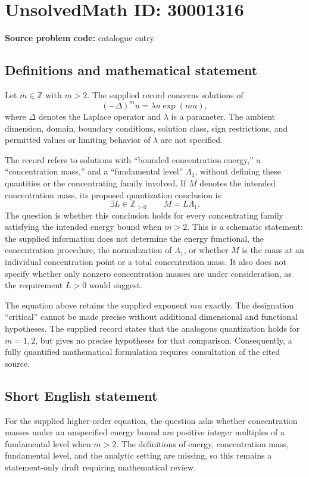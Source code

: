 \documentclass[11pt]{article}
\newcommand{\Z}{\mathbb{Z}}
\begin{document}
\section*{UnsolvedMath ID: 30001316}
\textbf{Source problem code:} catalogue entry
\subsection{Definitions and mathematical statement}
Let \(m\in\Z\) with \(m>2\). The supplied record concerns solutions of
\[
(-\Delta)^m u=\lambda u\exp(mu),
\]
where \(\Delta\) denotes the Laplace operator and \(\lambda\) is a parameter. The ambient dimension, domain, boundary conditions, solution class, sign restrictions, and permitted values or limiting behavior of \(\lambda\) are not specified.

The record refers to solutions with ``bounded concentration energy,'' a ``concentration mass,'' and a ``fundamental level'' \(\Lambda_1\), without defining these quantities or the concentrating family involved. If \(M\) denotes the intended concentration mass, its proposed quantization conclusion is
\[
\exists L\in\Z_{>0}\qquad M=L\Lambda_1.
\]
The question is whether this conclusion holds for every concentrating family satisfying the intended energy bound when \(m>2\). This is a schematic statement: the supplied information does not determine the energy functional, the concentration procedure, the normalization of \(\Lambda_1\), or whether \(M\) is the mass at an individual concentration point or a total concentration mass. It also does not specify whether only nonzero concentration masses are under consideration, as the requirement \(L>0\) would suggest.

The equation above retains the supplied exponent \(mu\) exactly. The designation ``critical'' cannot be made precise without additional dimensional and functional hypotheses. The supplied record states that the analogous quantization holds for \(m=1,2\), but gives no precise hypotheses for that comparison. Consequently, a fully quantified mathematical formulation requires consultation of the cited source.
\subsection{Short English statement}
For the supplied higher-order equation, the question asks whether concentration masses under an unspecified energy bound are positive integer multiples of a fundamental level when \(m>2\). The definitions of energy, concentration mass, fundamental level, and the analytic setting are missing, so this remains a statement-only draft requiring mathematical review.
\end{document}
